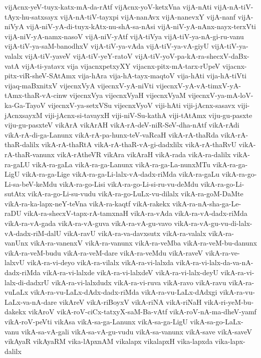 {vijAcnx-yeV-tuyx-katx-mA-da-rAtf
vijAcnx-yoV-ketxVna
vijA-nAti
vijA-nA-tiV-tAyx-hu-satxsayx
vijA-nA-tiV-tayxpi
vijA-nanAvx
vijA-nanevxY
vijA-nanf
vijA-niVyA
vijA-niV-yA-di-tuyx-kAtx-nu-shA-sa-nAsi
vijA-niV-yA-nAnx-nayx-terxVti
vijA-niV-yA-namx-nasoV
vijA-niV-yAtf
vijA-tiVya
vijA-tiV-ya-nA-gi-ru-vanu
vijA-tiV-ya-saM-banodhxV
vijA-tiV-ya-vAda
vijA-tiV-ya-vA-giyU
vijA-tiV-ya-valalx
vijA-tiV-yaveV
vijA-tiV-yeY-ratoV
vijA-tiV-yoV-pa-kA-ra-shecxV-daBx-vatA
vijA-ti-yatavx
vija
vijacnxpetxyXY
vijacnx-pitx-mA-tarx-rUpeV
vijacnx-pitx-viR-sheV-SAtAmx
vija-hAra
vija-hA-tayx-maqtoV
vija-hAti
vija-hA-tiVti
vijaq-maBxnitxV
vijecnxVyA
vijecnxV-yA-niVti
vijecnxV-yA-vA-timxV-yA-tAmx-thaR-vA-cinw
vijecnxVya
vijecnxVyaH
vijecnxVyaM
vijecnxV-ya-mA-loV-ka-Ga-TayoV
vijecnxV-ya-setxVSu
vijecnxVyoV
viji-hAti
viji-jAcnx-sasavx
viji-jAcnxsayxM
viji-jAcnx-si-tavayxH
viji-niV-Su-kathA
viji-tAtAmx
viju-gu-pasxte
viju-gu-pasxteV
vikArA
vikArAH
vikA-rA-deV-niR-SeV-dha-nAtf
vikA-rAdi
vikA-rA-di-ga-Lanunx
vikA-rA-pa-hunx-teV-vaRcaH
vikA-rA-thaRda
vikA-rA-thaR-dalilx
vikA-rA-thaRtA
vikA-rA-thaR-vA-gi-dadxlilx
vikA-rA-thaRvU
vikA-rA-thaR-vanunx
vikA-rAtheVR
vikAra
vikAraH
vikA-rada
vikA-ra-dalilx
vikA-ra-gaLU
vikA-ra-gaLa
vikA-ra-ga-Lanunx
vikA-ra-ga-La-nunxMTu
vikA-ra-ga-LigU
vikA-ra-ga-Lige
vikA-ra-ga-Li-lalx-vA-dadx-riMda
vikA-ra-gaLu
vikA-ra-go-Li-sa-beV-keMdu
vikA-ra-go-Lisi
vikA-ra-go-Li-si-ru-vu-deMdu
vikA-ra-go-Li-sutAtx
vikA-ra-go-Li-su-vudu
vikA-ra-go-LuLx-vu-dilalx
vikA-ra-goM-DaMte
vikA-ra-ka-lapx-neY-teVna
vikA-ra-kaqtf
vikA-rakekx
vikA-ra-nA-sha-ga-Le-raDU
vikA-ra-shecxV-tapx-rA-tamxnaH
vikA-ra-vAda
vikA-ra-vA-dadx-riMda
vikA-ra-vA-gada
vikA-ra-vA-guva
vikA-ra-vA-gu-vavo
vikA-ra-vA-gu-vu-di-lalx-vA-dadx-riM-dalU
vikA-ravU
vikA-ra-va-davxsutx
vikA-ra-valalx
vikA-ra-vanUnx
vikA-ra-vanenxV
vikA-ra-vanunx
vikA-ra-veMba
vikA-ra-veM-bu-danunx
vikA-ra-veM-budu
vikA-ra-veM-dare
vikA-ra-veMdu
vikA-raveV
vikA-ra-ve-lalxvU
vikA-ra-vi-deyo
vikA-ra-vilalx
vikA-ra-vi-lalxda
vikA-ra-vi-lalx-da-va-nA-dadx-riMda
vikA-ra-vi-lalxde
vikA-ra-vi-lalxdeV
vikA-ra-vi-lalx-deyU
vikA-ra-vi-lalx-di-dadxrU
vikA-ra-vi-lalxdudx
vikA-ra-vi-ruva
vikA-ravo
vikA-ravu
vikA-ra-vuLaLx
vikA-ra-vu-LaLx-dAdx-dadx-riMda
vikA-ra-vu-LaLx-dAdxgi
vikA-ra-vu-LaLx-va-nA-dare
vikAreV
vikA-riBoyxV
vikA-riNA
vikA-riNaH
vikA-ri-yeM-bu-dakekx
vikAroV
vikA-roV-ciCx-tatxyX-saM-Ba-vAtf
vikA-roV-nA-ma-dheV-yamf
vikA-roV-peVti
vikAsa
vikA-sa-ga-Lanunx
vikA-sa-ga-LigU
vikA-sa-go-LaLx-vanu
vikA-sa-vA-gali
vikA-sa-vA-gu-vudu
vikA-sa-vanunx
vikA-save
vikA-saveV
vikAyaR
vikAyaRM
vika-lApxnAM
vikalapx
vikalapxH
vika-lapxda
vika-lapx-dalilx
}
